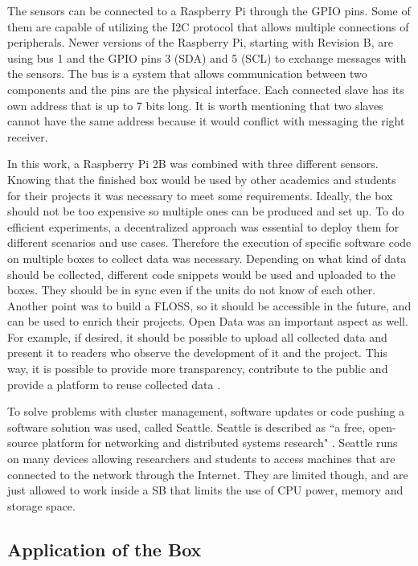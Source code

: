 \documentclass{article}      %
\begin{document}
The sensors can be connected to a Raspberry Pi through the \gls{GPIO} pins. Some of them are capable of utilizing the \gls{I2C} protocol that allows multiple connections of peripherals. Newer versions of the Raspberry Pi, starting with Revision B, are using bus 1 and the \gls{GPIO} pins 3 (\gls{SDA}) and 5 (\gls{SCL}) to exchange messages with the sensors. The bus is a system that allows communication between two components and the pins are the physical interface. Each connected slave has its own address that is up to 7 bits long. It is worth mentioning that two slaves cannot have the same address because it would conflict with messaging the right receiver. \cite[p.~167ff]{masteringPi}

In this work, a Raspberry Pi 2B was combined with three different sensors. Knowing that the finished box would be used by other academics and students for their projects it was necessary to meet some requirements. Ideally, the box should not be too expensive so multiple ones can be produced and set up. To do efficient experiments, a decentralized approach was essential to deploy them for different scenarios and use cases. Therefore the execution of specific software code on multiple boxes to collect data was necessary. Depending on what kind of data should be collected, different code snippets would be used and uploaded to the boxes. They should be in sync even if the units do not know of each other. Another point was to build a \gls{FLOSS}, so it should be accessible in the future, and can be used to enrich their projects. Open Data was an important aspect as well. For example, if desired, it should be possible to upload all collected data and present it to readers who observe the development of it and the project. This way, it is possible to provide more transparency, contribute to the public and provide a platform to reuse collected data \cite{openData}.

To solve problems with cluster management, software updates or code pushing a software solution was used, called Seattle. Seattle is described as ``a free, open-source platform for networking and distributed systems research" \cite{seattleGithub}. Seattle runs on many devices allowing researchers and students to access machines that are connected to the network through the Internet. They are limited though, and are just allowed to work inside a \gls{SB} that limits the use of \gls{CPU} power, memory and storage space. \cite{seattleFence} \cite{seattleSandbox}


\subsection{Application of the Box}
\end{document}
